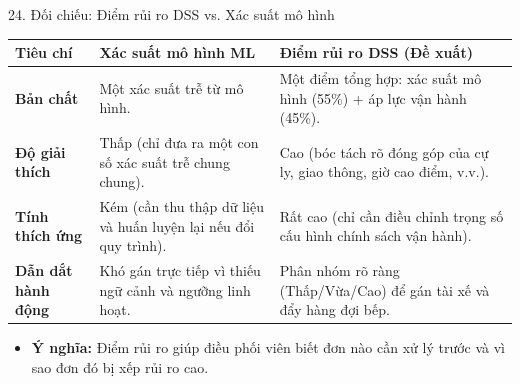 \documentclass[t, aspectratio=169, 11pt]{beamer}
\newcommand{\blk}[1]{\textbf{\color{hustprimary}#1}}
\begin{document}
\begin{frame}{24. Đối chiếu: Điểm rủi ro DSS vs. Xác suất mô hình}
    \begin{table}
        \centering\footnotesize
        \renewcommand{\arraystretch}{1.2}
        \begin{tabular}{p{2.3cm}p{5.1cm}p{5.1cm}}
        \toprule
        \textbf{Tiêu chí} & \textbf{Xác suất mô hình ML} & \textbf{Điểm rủi ro DSS (Đề xuất)} \\
        \midrule
        \blk{Bản chất} & Một xác suất trễ từ mô hình. & Một điểm tổng hợp: xác suất mô hình (55\%) + áp lực vận hành (45\%). \\
        \blk{Độ giải thích} & Thấp (chỉ đưa ra một con số xác suất trễ chung chung). & Cao (bóc tách rõ đóng góp của cự ly, giao thông, giờ cao điểm, v.v.). \\
        \blk{Tính thích ứng} & Kém (cần thu thập dữ liệu và huấn luyện lại nếu đổi quy trình). & Rất cao (chỉ cần điều chỉnh trọng số cấu hình chính sách vận hành). \\
        \blk{Dẫn dắt hành động} & Khó gán trực tiếp vì thiếu ngữ cảnh và ngưỡng linh hoạt. & Phân nhóm rõ ràng (Thấp/Vừa/Cao) để gán tài xế và đẩy hàng đợi bếp. \\
        \bottomrule
        \end{tabular}
    \end{table}
    \vspace{-0.1cm}
    \begin{itemize}
        \item \textbf{Ý nghĩa:} Điểm rủi ro giúp điều phối viên biết đơn nào cần xử lý trước và vì sao đơn đó bị xếp rủi ro cao.
    \end{itemize}
\end{frame}
\end{document}
